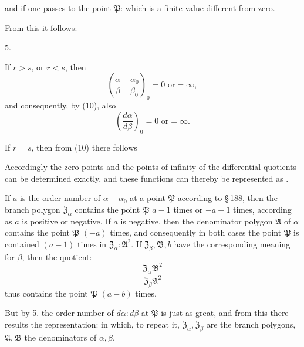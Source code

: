 and if one passes to the point $\mathfrak{P}$:
which is a finite value different from zero.

From this it follows:

5. 

If $r > s$, or $r < s$, then
\[
\left(\frac{\alpha-\alpha_0}{\beta-\beta_0}\right)_0 = 0 \text{ or} = \infty,
\]
and consequently, by (10), also
\[
\left(\frac{d\alpha}{d\beta}\right)_0 = 0 \text{ or} = \infty.
\]

If $r = s$, then from (10) there follows


Accordingly the zero points and the points of infinity of the differential quotients can be determined exactly, and these functions can thereby be represented as .

If $a$ is the order number of $\alpha - \alpha_0$ at a point $\mathfrak{P}$ according to \S\,188, then the branch polygon $\mathfrak{Z}_\alpha$ contains the point $\mathfrak{P}$ $a - 1$ times or $-a-1$ times, according as $a$ is positive or negative. If $a$ is negative, then the denominator polygon $\mathfrak{A}$ of $\alpha$ contains the point $\mathfrak{P}$ $(-a)$ times, and consequently in both cases the point $\mathfrak{P}$ is contained $(a-1)$ times in $\mathfrak{Z}_\alpha : \mathfrak{A}^2$. If $\mathfrak{Z}_\beta, \mathfrak{B}, b$ have the corresponding meaning for $\beta$, then the quotient:
\[
\frac{\mathfrak{Z}_\alpha \mathfrak{B}^2}{\mathfrak{Z}_\beta \mathfrak{A}^2}
\]
thus contains the point $\mathfrak{P}$ $(a-b)$ times.

But by 5. the order number of $d\alpha : d\beta$ at $\mathfrak{P}$ is just as great, and from this there results the representation:
in which, to repeat it, $\mathfrak{Z}_\alpha, \mathfrak{Z}_\beta$ are the branch polygons, $\mathfrak{A}, \mathfrak{B}$ the denominators of $\alpha, \beta$.
